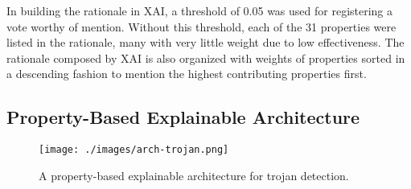 In building the rationale in XAI, a threshold of 0.05 was used for registering a
vote worthy of mention.  Without this threshold, each of the 31 properties were
listed in the rationale, many with very little weight due to low effectiveness.
The rationale composed by XAI is also organized with weights of properties
sorted in a descending fashion to mention the highest contributing properties
first.

\subsection{Property-Based Explainable Architecture}



\begin{figure}[H]
    \texttt{[image: ./images/arch-trojan.png]}
    \caption{A property-based explainable architecture for trojan detection.}
    \label{fig:trojan_arch}
\end{figure}

